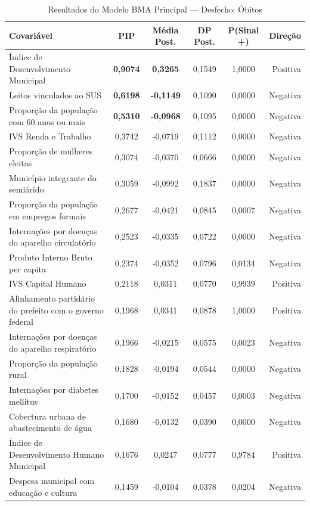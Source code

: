 \begin{table}[htbp]
\centering
\footnotesize
\caption{Resultados do Modelo BMA Principal — Desfecho: Óbitos}
\label{tab:bma_obitos}
\begin{tabular}{lccccr}
\toprule
\textbf{Covariável} & \textbf{PIP} & \textbf{Média Post.} & \textbf{DP Post.} & \textbf{P(Sinal +)} & \textbf{Direção} \\
\midrule
Índice de Desenvolvimento Municipal & \textbf{0,9074} & \textbf{0,3265} & 0,1549 & 1,0000 & Positiva \\
Leitos vinculados ao SUS & \textbf{0,6198} & \textbf{-0,1149} & 0,1090 & 0,0000 & Negativa \\
Proporção da população com 60 anos ou mais & \textbf{0,5310} & \textbf{-0,0968} & 0,1095 & 0,0000 & Negativa \\
IVS Renda e Trabalho & 0,3742 & -0,0719 & 0,1112 & 0,0000 & Negativa \\
Proporção de mulheres eleitas & 0,3074 & -0,0370 & 0,0666 & 0,0000 & Negativa \\
Município integrante do semiárido & 0,3059 & -0,0992 & 0,1837 & 0,0000 & Negativa \\
Proporção da população em empregos formais & 0,2677 & -0,0421 & 0,0845 & 0,0007 & Negativa \\
Internações por doenças do aparelho circulatório & 0,2523 & -0,0335 & 0,0722 & 0,0000 & Negativa \\
Produto Interno Bruto per capita & 0,2374 & -0,0352 & 0,0796 & 0,0134 & Negativa \\
IVS Capital Humano & 0,2118 & 0,0311 & 0,0770 & 0,9939 & Positiva \\
Alinhamento partidário do prefeito com o governo federal & 0,1968 & 0,0341 & 0,0878 & 1,0000 & Positiva \\
Internações por doenças do aparelho respiratório & 0,1966 & -0,0215 & 0,0575 & 0,0023 & Negativa \\
Proporção da população rural & 0,1828 & -0,0194 & 0,0544 & 0,0000 & Negativa \\
Internações por diabetes mellitus & 0,1700 & -0,0152 & 0,0457 & 0,0003 & Negativa \\
Cobertura urbana de abastecimento de água & 0,1680 & -0,0132 & 0,0390 & 0,0000 & Negativa \\
Índice de Desenvolvimento Humano Municipal & 0,1676 & 0,0247 & 0,0777 & 0,9784 & Positiva \\
Despesa municipal com educação e cultura & 0,1459 & -0,0104 & 0,0378 & 0,0204 & Negativa \\

\end{tabular}
\end{table}

